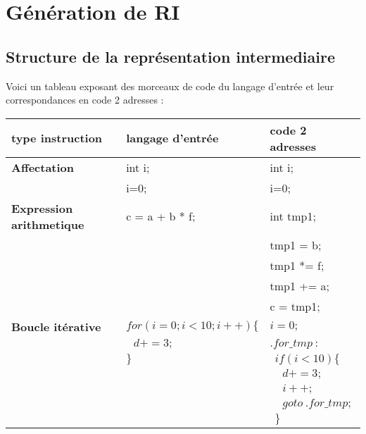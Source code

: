 \newpage
\section{Génération de RI}
\subsection{Structure de la représentation intermediaire}

Voici un tableau exposant des morceaux de code du langage d'entrée et leur correspondances en code 2 adresses : \\

\begin{tabular}{|l|l|l|}
  \hline
  type instruction & langage d'entrée & code 2 adresses \\
  \hline
  \textbf{Affectation} & int i; & int i; \tabularnewline
    & i=0; & i=0; \tabularnewline
  \hline
   \textbf{Expression arithmetique} & c = a + b * f; & int tmp1; \tabularnewline
   & & tmp1 = b; \tabularnewline
   & & tmp1 *= f; \tabularnewline
   & & tmp1 += a; \tabularnewline
   & & c = tmp1; \tabularnewline
  \hline
  \textbf{Boucle itérative} & \raggedleft $for(i=0; i<10; i++)\{$ & $i = 0;$ \tabularnewline
  & $\ \ \ d += 3;$ & \raggedleft $.for\_tmp\ :$ \tabularnewline
  & $\}$ & \raggedleft $\ \ if(i<10)\{$ \tabularnewline
  & & \raggedleft $\ \ \ \ \ d += 3;$ \tabularnewline
  & & \raggedleft $\ \ \ \ \ i++;$ \tabularnewline
  & & \raggedleft $\ \ \ \ \ goto\ .for\_tmp;$  \tabularnewline
  & & \raggedleft $\ \ \}$ \tabularnewline
  \hline
\end{tabular}

